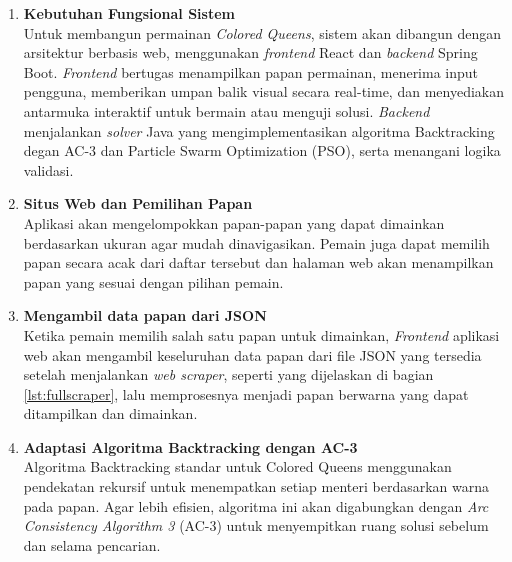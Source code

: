 \documentclass[a4paper,twoside]{article}
\begin{document}
	\begin{enumerate}
	\item \textbf{Kebutuhan Fungsional Sistem} \\
	Untuk membangun permainan \textit{Colored Queens}, sistem akan dibangun dengan arsitektur berbasis web, menggunakan \textit{frontend} React dan \textit{backend} Spring Boot. \textit{Frontend} bertugas menampilkan papan permainan, menerima input pengguna, memberikan umpan balik visual secara real-time, dan menyediakan antarmuka interaktif untuk bermain atau menguji solusi. \textit{Backend} menjalankan \textit{solver} Java yang mengimplementasikan algoritma Backtracking degan AC-3 dan Particle Swarm Optimization (PSO), serta menangani logika validasi.
	
	\item \textbf{Situs Web dan Pemilihan Papan} \\
	Aplikasi akan mengelompokkan papan-papan yang dapat dimainkan berdasarkan ukuran agar mudah dinavigasikan. Pemain juga dapat memilih papan secara acak dari daftar tersebut dan halaman web akan menampilkan papan yang sesuai dengan pilihan pemain.
	
	\item \textbf{Mengambil data papan dari JSON} \\
	Ketika pemain memilih salah satu papan untuk dimainkan, \textit{Frontend} aplikasi web akan mengambil keseluruhan data papan dari file JSON yang tersedia setelah menjalankan \textit{web scraper}, seperti yang dijelaskan di bagian \ref{lst:fullscraper}, lalu memprosesnya menjadi papan berwarna yang dapat ditampilkan dan dimainkan.
	
	\item \textbf{Adaptasi Algoritma Backtracking dengan AC-3} \\
	Algoritma Backtracking standar untuk Colored Queens menggunakan pendekatan rekursif untuk menempatkan setiap menteri berdasarkan warna pada papan. Agar lebih efisien, algoritma ini akan digabungkan dengan \textit{Arc Consistency Algorithm 3} (AC-3) untuk menyempitkan ruang solusi sebelum dan selama pencarian.
	

\end{enumerate}
\end{document}
